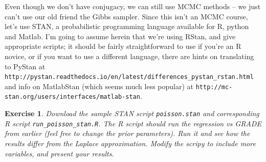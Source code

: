 \documentclass[twoside]{article}
\newcounter{lecnum}
\newtheorem{exercise}{Exercise}[lecnum]
\begin{document}
      Even though we don't have conjugacy, we can still use MCMC methods -- we just can't use our old friend the Gibbs sampler. Since this isn't an MCMC course, let's use STAN, a probabilistic programming language available for R, python and Matlab. I'm going to assume herein that we're using RStan, and give appropriate scripts; it should be fairly straightforward to use if you're an R novice, or if you want to use a different language, there are hints on translating to PyStan at \texttt{http://pystan.readthedocs.io/en/latest/differences\_pystan\_rstan.html} and info on MatlabStan (which seems much less popular) at \texttt{http://mc-stan.org/users/interfaces/matlab-stan}.
  \begin{exercise}
    Download the sample STAN script \texttt{poisson.stan} and corresponding R script \texttt{run\_poisson\_stan.R}. The R script should run the  regression vs GRADE from earlier (feel free to change the prior parameters). Run it and see how the results differ from the Laplace approximation. Modify the scripy to include more variables, and present your results.
  \end{exercise}
\end{document}
